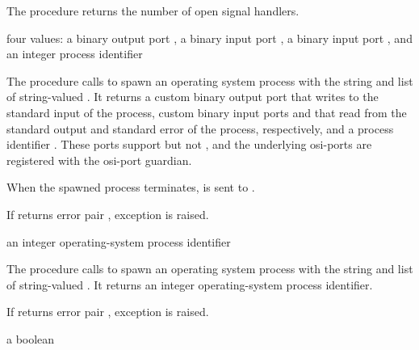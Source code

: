 The  procedure returns the number of open
signal handlers.

\begin{procedure}
\end{procedure}
\returns{} four values: a binary output port , a binary
input port , a binary input port ,
and an integer process identifier 

The  procedure calls  to spawn
an operating system process with the string  and list of
string-valued . It returns a custom binary output port
 that writes to the standard input of the process,
custom binary input ports  and  that
read from the standard output and standard error of the process,
respectively, and a process identifier . These ports
support  but not , and
the underlying osi-ports are registered with the osi-port
guardian.

When the spawned process terminates,  is sent to
.

If  returns error pair , exception  is raised.

\begin{procedure}
\end{procedure}
\returns{} an integer operating-system process identifier

The  procedure calls
 to spawn an operating system process with
the string  and list of string-valued .  It
returns an integer operating-system process identifier.

If  returns error pair , exception  is raised.

\begin{procedure}
\end{procedure}
\returns{} a boolean


